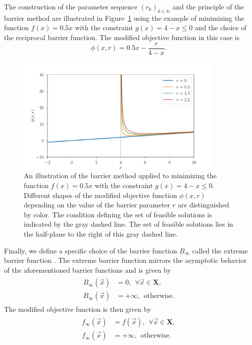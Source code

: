 The construction of the parameter sequence $ (r_k)_{k \in \mathbb{N}} $ and the principle of the barrier method are illustrated in Figure~\ref{fig:barrier} using the example of minimizing the function $ f(x) = 0.5x $ with the constraint $ g(x) = 4 - x \leq 0 $ and the choice of the reciprocal barrier function. The modified objective function in this case is
\begin{equation}
	\phi (x, r) = 0.5x - \frac{r}{4-x}.
\end{equation}

\begin{figure}[H]
	\centering
	\includegraphics[width=0.9\textwidth]{figures/barrier.pdf}
	\caption{An illustration of the barrier method applied to minimizing the function $ f(x) = 0.5x $ with the constraint $ g(x) = 4 - x \leq 0 $. Different shapes of the modified objective function $ \phi (x, r) $ depending on the value of the barrier parameter $ r $ are distinguished by color. The condition defining the set of feasible solutions is indicated by the gray dashed line. The set of feasible solutions lies in the half-plane to the right of this gray dashed line.}
	\label{fig:barrier}
\end{figure}

Finally, we define a specific choice of the barrier function $ B_{\infty} $ called the extreme barrier function \cite{BBO-textbook}. The extreme barrier function mirrors the asymptotic behavior of the aforementioned barrier functions and is given by
\begin{align}
	\begin{split}
		B_{\infty}(\vec{x}) &= 0, \ \ \forall \vec{x} \in \mathbf{X},\\[6pt]
		B_{\infty}(\vec{x}) &= +\infty, \ \ \text{otherwise.}
	\end{split}
\end{align}
The modified objective function is then given by
\begin{align}\label{eq:extreme barrier}
	\begin{split}
		f_{\infty}(\vec{x}) &= f(\vec{x}) , \ \ \forall \vec{x} \in \mathbf{X},\\[6pt]
		f_{\infty}(\vec{x}) &= +\infty, \ \ \text{otherwise.}
	\end{split}
\end{align}